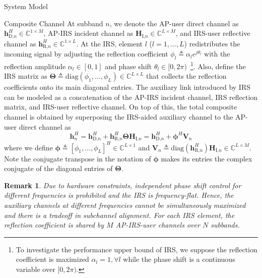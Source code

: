 \documentclass[journal]{IEEEtran}
\newtheorem{remark}{Remark}
\begin{document}
\begin{section}{System Model}
		\begin{subsection}{Composite Channel}
			At subband $n$, we denote the AP-user direct channel as $\boldsymbol{h}_{\text{D,}n}^H \in \mathbb{C}^{1 \times M}$, AP-IRS incident channel as $\boldsymbol{H}_{\text{I,}n} \in \mathbb{C}^{L \times M}$, and IRS-user reflective channel as $\boldsymbol{h}_{\text{R,}n}^H \in \mathbb{C}^{1 \times L}$. At the IRS, element $l$ ($l=1,\dots,L$) redistributes the incoming signal by adjusting the reflection coefficient $\phi_l \triangleq \alpha_l e^{j\theta_l}$ with the reflection amplitude $\alpha_l \in [0,1]$ and phase shift $\theta_l \in [0,2\pi)$~\footnote{To investigate the performance upper bound of IRS, we suppose the reflection coefficient is maximized $\alpha_l=1,\forall l$ while the phase shift is a continuous variable over $[0,2\pi)$.}. Also, define the IRS matrix as $\boldsymbol{\Theta} \triangleq \mathrm{diag}(\phi_1, \dots, \phi_L) \in \mathbb{C}^{L \times L}$ that collects the reflection coefficients onto its main diagonal entries. The auxiliary link introduced by IRS can be modeled as a concatenation of the AP-IRS incident channel, IRS reflection matrix, and IRS-user reflective channel. On top of this, the total composite channel is obtained by superposing the IRS-aided auxiliary channel to the AP-user direct channel as
			\begin{equation}\label{eq:h_n}
				\boldsymbol{h}_{n}^H = \boldsymbol{h}_{\text{D,}n}^H + \boldsymbol{h}_{\text{R,}n}^H \boldsymbol{\Theta} \boldsymbol{H}_{\text{I,}n} = \boldsymbol{h}_{\text{D,}n}^H + \boldsymbol{\phi}^H \boldsymbol{V}_{n}
			\end{equation}
			where we define $\boldsymbol{\phi} \triangleq [\phi_1, \dots, \phi_L]^H \in \mathbb{C}^{L \times 1}$ and $\boldsymbol{V}_{n} \triangleq \mathrm{diag}(\boldsymbol{h}_{\text{R,}n}^H)\boldsymbol{H}_{\text{I,}n} \in \mathbb{C}^{L \times M}$. Note the conjugate transpose in the notation of $\boldsymbol{\phi}$ makes its entries the complex conjugate of the diagonal entries of $\boldsymbol{\Theta}$.
			\begin{remark}\label{re:irs_frequency_flat}
				Due to hardware constraints, independent phase shift control for different frequencies is prohibited and the IRS is frequency-flat. Hence, the auxiliary channels at different frequencies cannot be simultaneously maximized and there is a tradeoff in subchannel alignment. For each IRS element, the reflection coefficient is shared by $M$ AP-IRS-user channels over $N$ subbands.
			\end{remark}
		\end{subsection}



\end{section}
\end{document}
